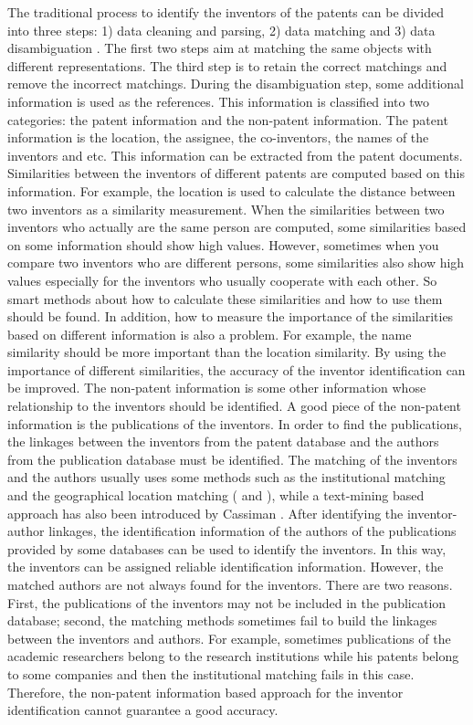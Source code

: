 The traditional process to identify the inventors of the patents can be divided into three steps: 1) data cleaning and parsing, 2) data matching and 3) data disambiguation \cite{iaifs}.  The first two steps aim at matching the same objects with different representations. The third step is to retain the correct matchings and remove the incorrect matchings. During the disambiguation step, some additional information is used as the references. This information is classified into two categories: the patent information and the non-patent information. The patent information is the location, the assignee, the co-inventors, the names of the inventors and etc. This information can be extracted from the patent documents.  Similarities between the inventors of different patents are computed based on this information. For example,  the location is used to calculate the distance between two inventors as a similarity measurement. When the similarities between two inventors who actually are the same person are computed, some similarities based on some information should show high values. However, sometimes when you compare two inventors who are different persons, some similarities also show high values especially for the inventors who usually cooperate with each other. So smart methods about how to calculate these similarities and how to use them should be found. In addition, how to measure the importance of the similarities based on different information is also a problem. For example, the name similarity should be more important than the location similarity. By using the importance of different similarities, the accuracy of the inventor identification can be improved. The non-patent information is some other information whose relationship to the inventors should be identified. A good piece of the non-patent information is the publications of the inventors. In order to find the publications, the linkages between the inventors from the patent database and the authors from the publication database must be identified.  The matching of the inventors and the authors usually uses some methods such as the institutional matching and the geographical location matching (\cite{iaifs} and \cite{Boyack2008173}), while a text-mining based approach has also been introduced by Cassiman \cite{MISLT}.  After identifying the inventor-author linkages, the identification information of the authors of the publications  provided by some databases can be used to identify the inventors. In this way, the inventors can be assigned reliable identification information. However, the matched authors are not always found for the inventors. There are two reasons. First, the publications of the inventors may not be included in the publication database; second, the matching methods sometimes fail  to build the linkages between the inventors and authors. For example, sometimes publications of the academic researchers belong to the research institutions while his patents belong to some companies and  then the institutional matching fails in this case. Therefore, the non-patent information based approach for the inventor identification cannot guarantee a good accuracy.

